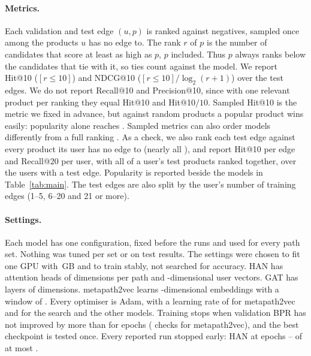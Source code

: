 \paragraph{Metrics.} Each validation and test edge $(u, p)$ is ranked against 
negatives, sampled once among the products $u$ has no edge to. The rank $r$ of $p$ is the number of
candidates that score at least as high as $p$, $p$ included. Thus $p$ always ranks below the
candidates that tie with it, so ties count against the model. We report Hit@10 ($[r \le 10]$) and
NDCG@10 ($[r \le 10] / \log_2(r + 1)$) over the  test edges. We do not report
Recall@10 and Precision@10, since with one relevant product per ranking they equal Hit@10 and
Hit@10$/10$. Sampled Hit@10 is the metric we fixed in advance, but against 
random products a popular product wins easily: popularity alone reaches . Sampled
metrics can also order models differently from a full ranking \citep{krichene2022sampled}. As a
check, we also rank each test edge against every product its user has no edge to (nearly all
), and report Hit@10 per edge and Recall@20 per user, with all of a user's test
products ranked together, over the  users with a test edge. Popularity is reported
beside the models in Table~\ref{tab:main}. The test edges are also split by the user's number of
training edges (1--5, 6--20 and 21 or more).

\paragraph{Settings.} Each model has one configuration, fixed before the runs and used for every
path set. Nothing was tuned per set or on test results. The settings were chosen to fit one GPU
with \,GB and to train stably, not searched for accuracy. HAN has
 attention heads of  dimensions per path and
-dimensional user vectors. GAT has  layers of
 dimensions. metapath2vec learns -dimensional embeddings with a
window of . Every optimiser is Adam, with a learning rate of  for
metapath2vec and  for the search and the other models. Training stops when
validation BPR has not improved by more than  for 
epochs ( checks for metapath2vec), and the best checkpoint is tested once.
Every reported run stopped early: HAN at epochs -- of at most
.

